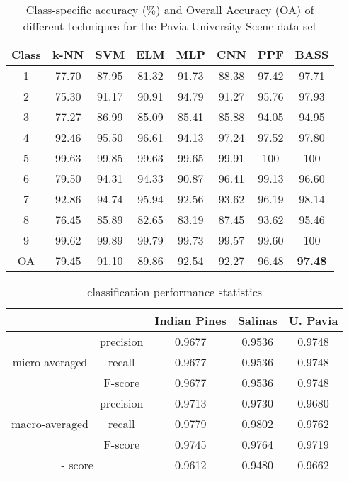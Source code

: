 \documentclass[journal]{IEEEtran}
\begin{document}
\begin{table}
\centering
\caption{Class-specific accuracy (\%) and Overall Accuracy (OA) of different techniques for the Pavia University Scene data set}
\label{table:Pavia_acc_comp}
\begin{tabular}{|c|c|c|c|c|c|c|c|}
\hline
Class & k-NN  & SVM   & ELM   & MLP   & CNN   & PPF   & BASS             \\ \hline
1     & 77.70 & 87.95 & 81.32 & 91.73 & 88.38 & 97.42 & 97.71            \\
2     & 75.30 & 91.17 & 90.91 & 94.79 & 91.27 & 95.76 & 97.93            \\
3     & 77.27 & 86.99 & 85.09 & 85.41 & 85.88 & 94.05 & 94.95            \\
4     & 92.46 & 95.50 & 96.61 & 94.13 & 97.24 & 97.52 & 97.80            \\
5     & 99.63 & 99.85 & 99.63 & 99.65 & 99.91 & 100   & 100              \\
6     & 79.50 & 94.31 & 94.33 & 90.87 & 96.41 & 99.13 & 96.60            \\
7     & 92.86 & 94.74 & 95.94 & 92.56 & 93.62 & 96.19 & 98.14            \\
8     & 76.45 & 85.89 & 82.65 & 83.19 & 87.45 & 93.62 & 95.46            \\
9     & 99.62 & 99.89 & 99.79 & 99.73 & 99.57 & 99.60 & 100              \\ \hline
OA    & 79.45 & 91.10 & 89.86 & 92.54 & 92.27 & 96.48 & \textbf{97.48} \\ \hline
\end{tabular}
\end{table}


\begin{table}
\centering
\caption{classification performance statistics}
\label{table:kappa_scores}
\begin{tabular}{cc|c|c|c|}
\cline{3-5}
                                                      &           & Indian Pines & Salinas & U. Pavia \\ \hline
\multicolumn{1}{|c|}{\multirow{3}{*}{micro-averaged}} & precision & 0.9677       & 0.9536  & 0.9748   \\ \cline{2-5} 
\multicolumn{1}{|c|}{}                                & recall    & 0.9677       & 0.9536  & 0.9748   \\ \cline{2-5} 
\multicolumn{1}{|c|}{}                                & F-score   & 0.9677       & 0.9536  & 0.9748   \\ \hline
\multicolumn{1}{|c|}{\multirow{3}{*}{macro-averaged}} & precision & 0.9713       & 0.9730  & 0.9680   \\ \cline{2-5} 
\multicolumn{1}{|c|}{}                                & recall    & 0.9779       & 0.9802  & 0.9762   \\ \cline{2-5} 
\multicolumn{1}{|c|}{}                                & F-score   & 0.9745       & 0.9764  & 0.9719   \\ \hline
\multicolumn{2}{|c|}{- score}                             & 0.9612       & 0.9480  & 0.9662   \\ \hline
\end{tabular}
\end{table}
\end{document}
